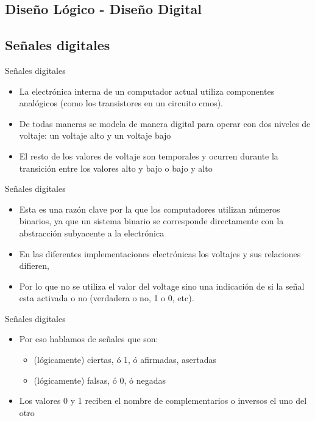 \documentclass[aspectratio=169,compress]{beamer}
\begin{document}
\begin{footnotesize}


\section{Diseño Lógico - Diseño Digital}

\subsection{Señales digitales}

\begin{frame}{Señales digitales}
\begin{itemize}
\item La electrónica interna de un computador actual 
utiliza componentes analógicos (como los transistores en un circuito cmos).
\bigskip
\item De todas maneras se modela de manera digital para operar con dos niveles de 
voltaje: un voltaje alto y un voltaje bajo
\bigskip
\item El resto de los valores de voltaje son 
temporales y ocurren durante la transición 
entre los valores alto y bajo o bajo y alto
\end{itemize}
\end{frame}







\begin{frame}{Señales digitales}
\begin{itemize}
\item Esta es una razón clave por la que los 
computadores utilizan números binarios, ya 
que un sistema binario se corresponde 
directamente con la abstracción subyacente a 
la electrónica
\bigskip
\item En las diferentes implementaciones 
electrónicas los voltajes y sus relaciones difieren,
\bigskip
\item Por lo que no se utiliza el valor del voltage sino una indicación de si la señal esta activada o no (verdadera o no, 1 o 0, etc).

\end{itemize}
\end{frame}





\begin{frame}{Señales digitales}
\begin{itemize}
\item Por eso hablamos de señales que son:
\begin{itemize}
\item (lógicamente) ciertas, ó 1, ó 
afirmadas, asertadas
\item (lógicamente) falsas, ó 0, ó  
negadas
\end{itemize}
\item Los valores 0 y 1 reciben el nombre de 
complementarios o inversos
 el uno del otro


\end{itemize}
\end{frame}
\end{footnotesize}
\end{document}
